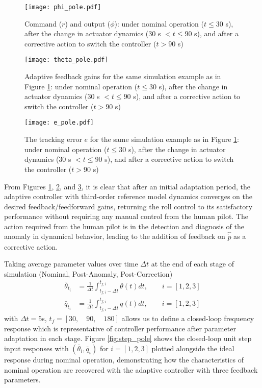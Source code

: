 \begin{figure}[h!]
	\centering
	\texttt{[image: phi\_pole.pdf]}
	\caption{Command ($r$) and output ($\phi$): under nominal operation ($t \leq 30$ s), after the change in actuator dynamics ($30$ s $< t \leq 90$ s), and after a corrective action to switch the controller ($t > 90$ s)}
	\label{fig:command_and_output}
\end{figure}

\begin{figure}[h!]
	\centering
	\texttt{[image: theta\_pole.pdf]}
	\caption{Adaptive feedback gains for the same simulation example as in Figure \ref{fig:command_and_output}: under nominal operation ($t \leq 30$ s), after the change in actuator dynamics ($30$ s $< t \leq 90$ s), and after a corrective action to switch the controller ($t > 90$ s)}
	\label{fig:theta}
\end{figure}

\begin{figure}[h!]
	\centering
	\texttt{[image: e\_pole.pdf]}
	\caption{The tracking error $e$ for the same simulation example as in Figure \ref{fig:command_and_output}: under nominal operation ($t \leq 30$ s), after the change in actuator dynamics ($30$ s $< t \leq 90$ s), and after a corrective action to switch the controller ($t > 90$ s)}
	\label{fig:error}
\end{figure}

From Figures \ref{fig:command_and_output}, \ref{fig:theta}, and \ref{fig:error}, it is clear that after an initial adaptation period, the adaptive controller with third-order reference model dynamics converges on the desired feedback/feedforward gains, returning the roll control to its satisfactory performance without requiring any manual control from the human pilot. The action required from the human pilot is in the detection and diagnosis of the anomaly in dynamical behavior, leading to the addition of feedback on $\hat{\dot{p}}$ as a corrective action. 

Taking average parameter values over time $\Delta t$ at the end of each stage of simulation (Nominal, Post-Anomaly, Post-Correction)
\begin{align}
	\bar{\theta}_{t_i} &= \frac{1}{\Delta t} \int_{t_{f,i}-\Delta t}^{t_{f,i}} \theta(t) dt, \qquad i = [1, 2, 3] \label{eqn:theta_bar}\\
	\bar{q}_{t_i} &= \frac{1}{\Delta t} \int_{t_{f,i}-\Delta t}^{t_{f,i}} q(t) dt, \qquad i = [1, 2, 3] \label{eqn:q_bar}
\end{align}
with $\Delta t = 5$s, $t_f = [30, \quad 90, \quad 180]$ allows us to define a closed-loop frequency response which is representative of controller performance after parameter adaptation in each stage. Figure \ref{fig:step_pole} shows the closed-loop unit step input responses with $(\bar{\theta}_i, \bar{q}_i)$ for $i = [1, 2, 3]$ plotted alongside the ideal response during nominal operation, demonstrating how the characteristics of nominal operation are recovered with the adaptive controller with three feedback parameters.

